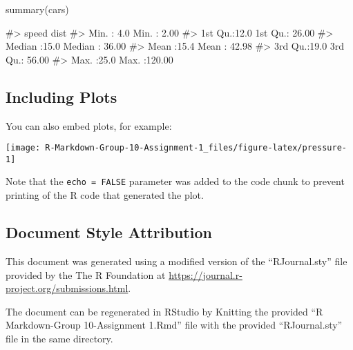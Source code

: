 \begin{Schunk}
\begin{Sinput}
summary(cars)
\end{Sinput}
\begin{Soutput}
#>      speed           dist       
#>  Min.   : 4.0   Min.   :  2.00  
#>  1st Qu.:12.0   1st Qu.: 26.00  
#>  Median :15.0   Median : 36.00  
#>  Mean   :15.4   Mean   : 42.98  
#>  3rd Qu.:19.0   3rd Qu.: 56.00  
#>  Max.   :25.0   Max.   :120.00
\end{Soutput}
\end{Schunk}

\hypertarget{including-plots}{%
\subsection{Including Plots}\label{including-plots}}

You can also embed plots, for example:

\begin{Schunk}

\texttt{[image: R-Markdown-Group-10-Assignment-1\_files/figure-latex/pressure-1]} \end{Schunk}

Note that the \texttt{echo\ =\ FALSE} parameter was added to the code
chunk to prevent printing of the R code that generated the plot.

\hypertarget{document-style-attribution}{%
\subsection{Document Style
Attribution}\label{document-style-attribution}}

This document was generated using a modified version of the
``RJournal.sty'' file provided by the The R Foundation at
\url{https://journal.r-project.org/submissions.html}.

The document can be regenerated in RStudio by Knitting the provided ``R
Markdown-Group 10-Assignment 1.Rmd'' file with the provided
``RJournal.sty'' file in the same directory.


\address{%
Alex Fung\\
\\
\\
}


\address{%
Viswesh Krishnamurthy\\
\\
\\
}


\address{%
Tony Lee\\
\\
\\
}


\address{%
Patrick Osborne\\
\\
\\
}


